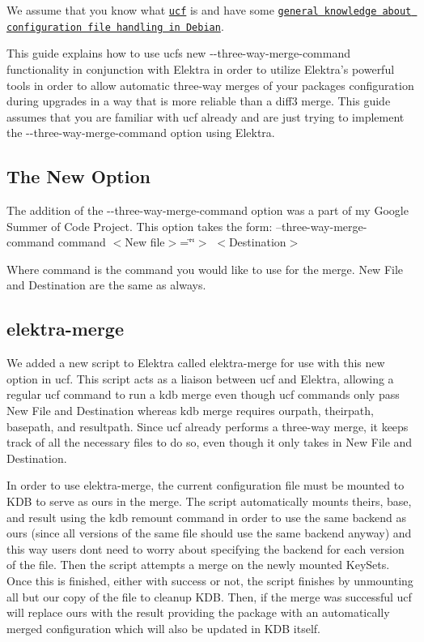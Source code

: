 We assume that you know what \href{https://packages.debian.org/sid/ucf}{\tt ucf} is and have some \href{https://wiki.debian.org/ConfigPackages}{\tt general knowledge about configuration file handling in Debian}.

This guide explains how to use ucf\textquotesingle{}s new {\ttfamily -\/-\/three-\/way-\/merge-\/command} functionality in conjunction with Elektra in order to utilize Elektra’s powerful tools in order to allow automatic three-\/way merges of your package\textquotesingle{}s configuration during upgrades in a way that is more reliable than a diff3 merge. This guide assumes that you are familiar with ucf already and are just trying to implement the {\ttfamily -\/-\/three-\/way-\/merge-\/command} option using Elektra.

\subsection*{The New Option}

The addition of the {\ttfamily -\/-\/three-\/way-\/merge-\/command} option was a part of my Google Summer of Code Project. This option takes the form\+: --three-\/way-\/merge-\/command command $<$\+New file$>$=\char`\"{}\char`\"{}$>$ $<$\+Destination$>$

Where {\ttfamily command} is the command you would like to use for the merge. {\ttfamily New File} and {\ttfamily Destination} are the same as always.

\subsection*{elektra-\/merge}

We added a new script to Elektra called elektra-\/merge for use with this new option in ucf. This script acts as a liaison between ucf and Elektra, allowing a regular ucf command to run a {\ttfamily kdb merge} even though ucf commands only pass {\ttfamily New File} and {\ttfamily Destination} whereas kdb merge requires {\ttfamily ourpath}, {\ttfamily theirpath}, {\ttfamily basepath}, and {\ttfamily resultpath}. Since ucf already performs a three-\/way merge, it keeps track of all the necessary files to do so, even though it only takes in {\ttfamily New File} and {\ttfamily Destination}.

In order to use {\ttfamily elektra-\/merge}, the current configuration file must be mounted to K\+DB to serve as {\ttfamily ours} in the merge. The script automatically mounts {\ttfamily theirs}, {\ttfamily base}, and {\ttfamily result} using the {\ttfamily kdb remount} command in order to use the same backend as {\ttfamily ours} (since all versions of the same file should use the same backend anyway) and this way users don\textquotesingle{}t need to worry about specifying the backend for each version of the file. Then the script attempts a merge on the newly mounted Key\+Sets. Once this is finished, either with success or not, the script finishes by unmounting all but {\ttfamily our} copy of the file to cleanup K\+DB. Then, if the merge was successful ucf will replace {\ttfamily ours} with the result providing the package with an automatically merged configuration which will also be updated in K\+DB itself.

